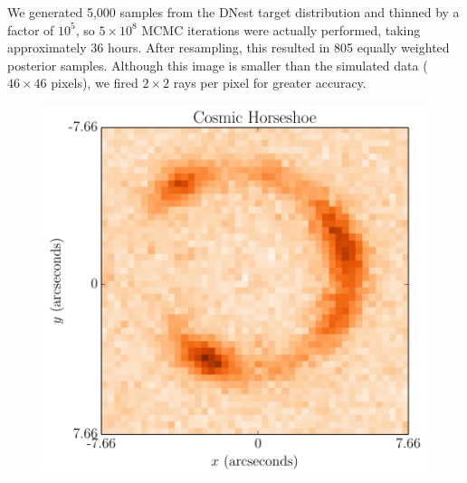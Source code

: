 \documentclass[useAMS,usenatbib]{mn2e}
\begin{document}
We generated 5,000 samples from the DNest target distribution and thinned
by a factor of $10^5$, so $5 \times 10^8$ MCMC iterations were actually
performed, taking approximately 36 hours. After resampling, this resulted in 805
equally weighted posterior samples. Although this image is smaller than the
simulated data ($46 \times 46$ pixels), we fired $2 \times 2$ rays per pixel
for greater accuracy.



\begin{figure}
\begin{center}
\includegraphics[scale=0.5]{horseshoe_image.pdf}
\caption{\label{fig:horseshoe_image}}
\end{center}
\end{figure}
\end{document}
